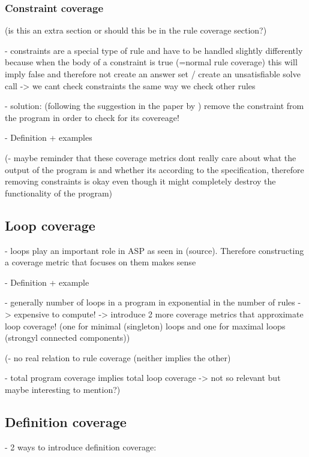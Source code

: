 \subsubsection{Constraint coverage}
\label{subsubsec:Coverage metrics/Branch-like coverage/Rule coverage/Constraint coverage}
(is this an extra section or should this be in the rule coverage section?)

- constraints are a special type of rule and have to be handled slightly differently because when the body of a constraint is true 
(=normal rule coverage) this will imply false and therefore not create an answer set / create an unsatisfiable solve call -> we 
cant check constraints the same way we check other rules

- solution: (following the suggestion in the paper by \textcite{Jan+11}) remove the constraint from the program in order to check 
for its covereage!

- Definition + examples

(- maybe reminder that these coverage metrics dont really care about what the output of the program is and whether its according to 
the specification, therefore removing constraints is okay even though it might completely destroy the functionality of the program)

\subsection{Loop coverage}
\label{subsec:Coverage metrics/Branch-like coverage/Loop coverage}
- loops play an important role in ASP as seen in (source). Therefore constructing a coverage metric that focuses on them makes sense

- Definition + example

- generally number of loops in a program in exponential in the number of rules -> expensive to compute! -> introduce 2 more 
coverage metrics that approximate loop coverage! (one for minimal (singleton) loops and one for maximal loops (strongyl connected 
components))

(- no real relation to rule coverage (neither implies the other)

- total program coverage implies total loop coverage -> not so relevant but maybe interesting to mention?)

\subsection{Definition coverage}
\label{subsec:Coverage metrics/Branch-like coverage/Definition coverage}
- 2 ways to introduce definition coverage: 
    
